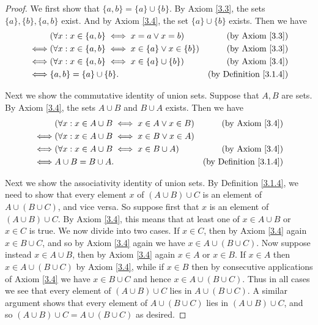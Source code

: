 \begin{proof}
    We first show that \(\{a, b\} = \{a\} \cup \{b\}\).
    By Axiom \ref{3.3}, the sets \(\{a\}, \{b\}, \{a, b\}\) exist.
    And by Axiom \ref{3.4}, the set \(\{a\} \cup \{b\}\) exists.
    Then we have
    \begin{align*}
             & (\forall x : x \in \{a, b\} \iff x = a \lor x = b)             & \text{(by Axiom \ref{3.3})}        \\
        \iff & (\forall x : x \in \{a, b\} \iff x \in \{a\} \lor x \in \{b\}) & \text{(by Axiom \ref{3.3})}        \\
        \iff & (\forall x : x \in \{a, b\} \iff x \in \{a\} \cup \{b\})       & \text{(by Axiom \ref{3.4})}        \\
        \iff & \{a, b\} = \{a\} \cup \{b\}.                                   & \text{(by Definition \ref{3.1.4})}
    \end{align*}

    Next we show the commutative identity of union sets.
    Suppose that \(A, B\) are sets.
    By Axiom \ref{3.4}, the sets \(A \cup B\) and \(B \cup A\) exists.
    Then we have
    \begin{align*}
             & (\forall x : x \in A \cup B \iff x \in A \lor x \in B) & \text{(by Axiom \ref{3.4})}        \\
        \iff & (\forall x : x \in A \cup B \iff x \in B \lor x \in A)                                      \\
        \iff & (\forall x : x \in A \cup B \iff x \in B \cup A)       & \text{(by Axiom \ref{3.4})}        \\
        \iff & A \cup B = B \cup A.                                   & \text{(by Definition \ref{3.1.4})}
    \end{align*}

    Next we show the associativity identity of union sets.
    By Definition \ref{3.1.4}, we need to show that every element \(x\) of \((A \cup B) \cup C\) is an element of \(A \cup (B \cup C)\), and vice versa.
    So suppose first that \(x\) is an element of \((A \cup B) \cup C\).
    By Axiom \ref{3.4}, this means that at least one of \(x \in A \cup B\) or \(x \in C\) is true.
    We now divide into two cases.
    If \(x \in C\), then by Axiom \ref{3.4} again \(x \in B \cup C\), and so by Axiom \ref{3.4} again we have \(x \in A \cup (B \cup C)\).
    Now suppose instead \(x \in A \cup B\), then by Axiom \ref{3.4} again \(x \in A\) or \(x \in B\).
    If \(x \in A\) then \(x \in A \cup (B \cup C)\) by Axiom \ref{3.4}, while if \(x \in B\) then by consecutive applications of Axiom \ref{3.4} we have \(x \in B \cup C\) and hence \(x \in A \cup (B \cup C)\).
    Thus in all cases we see that every element of \((A \cup B) \cup C\) lies in \(A \cup (B \cup C)\).
    A similar argument shows that every element of \(A \cup (B \cup C)\) lies in \((A \cup B) \cup C\), and so \((A \cup B) \cup C = A \cup (B \cup C) \) as desired.


\end{proof}
